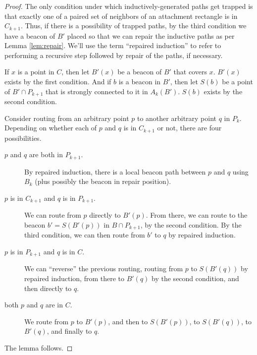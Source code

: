 \documentclass{article}
\begin{document}
	\begin{proof}
		The only condition under which inductively-generated paths get trapped is that
		exactly one of a paired set of neighbors of an attachment rectangle is in
		$C_{k+1}$.
		Thus, if there is a possibility of trapped paths, by the third condition we
		have a beacon of $B'$ placed so that we can repair the inductive paths as per
		Lemma \ref{lem:repair}.
		We'll use the term ``repaired induction'' to refer to performing a recursive
		step followed by repair of the paths, if necessary.
		
		If $x$ is a point in $C$, then let $B'(x)$ be a beacon of $B'$ that covers
		$x$.  $B'(x)$ exists by the first condition.  And if $b$ is a beacon in $B'$,
		then let $S(b)$ be a point of $B' \cap P_{k+1}$ that is strongly connected to
		it in $A_k(B')$.  $S(b)$ exists by the second condition.
		
		Consider routing from an
		arbitrary point $p$ to another arbitrary point $q$ in $P_k$.
		Depending on whether each of $p$ and $q$ is in $C_{k+1}$ or not, there are
		four possibilities.

		\begin{description}
		\item[$p$ and $q$ are both in $P_{k+1}$.]
			By repaired induction, there is a local beacon path between $p$ and $q$
			using $B_k$ (plus possibly the beacon in repair position).

		\item[$p$ is in $C_{k+1}$ and $q$ is in $P_{k+1}$.]
			We can route from $p$ directly to $B'(p)$.
			From there, we can route to the beacon $b' = S(B'(p))$ in $B \cap P_{k+1}$,
			by the second condition.
			By the third condition,
			we can then route from $b'$ to $q$ by
			repaired induction.

		\item[$p$ is in $P_{k+1}$ and $q$ is in $C$.] 
			We can ``reverse'' the previous routing,
			routing from $p$ to $S(B'(q))$ by repaired induction,
			from there to $B'(q)$ by the second condition,
			and then directly to $q$.
		
		\item[both $p$ and $q$ are in $C$.]
			We route from $p$ to $B'(p)$, and then to $S(B'(p))$,
			to $S(B'(q))$, to $B'(q)$, and finally to $q$.
		\end{description}
		
		The lemma follows.

	\end{proof}
\end{document}
